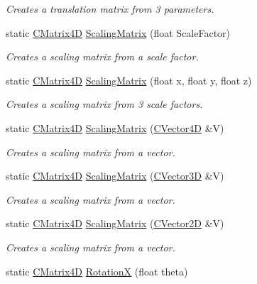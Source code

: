 \begin{DoxyCompactItemize}
\begin{DoxyCompactList}\small\item\em Creates a translation matrix from 3 parameters. \end{DoxyCompactList}\item 
static \hyperlink{struct_c_matrix4_d}{C\+Matrix4D} \hyperlink{struct_c_matrix4_d_a6b519efa74b6134f712a69a2ec471fb9}{Scaling\+Matrix} (float Scale\+Factor)
\begin{DoxyCompactList}\small\item\em Creates a scaling matrix from a scale factor. \end{DoxyCompactList}\item 
static \hyperlink{struct_c_matrix4_d}{C\+Matrix4D} \hyperlink{struct_c_matrix4_d_a54fdd06d47f8da9560f07c52750ee17a}{Scaling\+Matrix} (float x, float y, float z)
\begin{DoxyCompactList}\small\item\em Creates a scaling matrix from 3 scale factors. \end{DoxyCompactList}\item 
static \hyperlink{struct_c_matrix4_d}{C\+Matrix4D} \hyperlink{struct_c_matrix4_d_acd16f0ebee9562660416714af6982f10}{Scaling\+Matrix} (\hyperlink{struct_c_vector4_d}{C\+Vector4D} \&V)
\begin{DoxyCompactList}\small\item\em Creates a scaling matrix from a vector. \end{DoxyCompactList}\item 
static \hyperlink{struct_c_matrix4_d}{C\+Matrix4D} \hyperlink{struct_c_matrix4_d_a7db2989eb1047f1ac1d25c6489b6c662}{Scaling\+Matrix} (\hyperlink{struct_c_vector3_d}{C\+Vector3D} \&V)
\begin{DoxyCompactList}\small\item\em Creates a scaling matrix from a vector. \end{DoxyCompactList}\item 
static \hyperlink{struct_c_matrix4_d}{C\+Matrix4D} \hyperlink{struct_c_matrix4_d_aa0b0e0aa3867f6169d245643360feb27}{Scaling\+Matrix} (\hyperlink{struct_c_vector2_d}{C\+Vector2D} \&V)
\begin{DoxyCompactList}\small\item\em Creates a scaling matrix from a vector. \end{DoxyCompactList}\item 
static \hyperlink{struct_c_matrix4_d}{C\+Matrix4D} \hyperlink{struct_c_matrix4_d_a5bd01169974b8a228202f40bcb691a0f}{RotationX} (float theta)

\end{DoxyCompactItemize}
